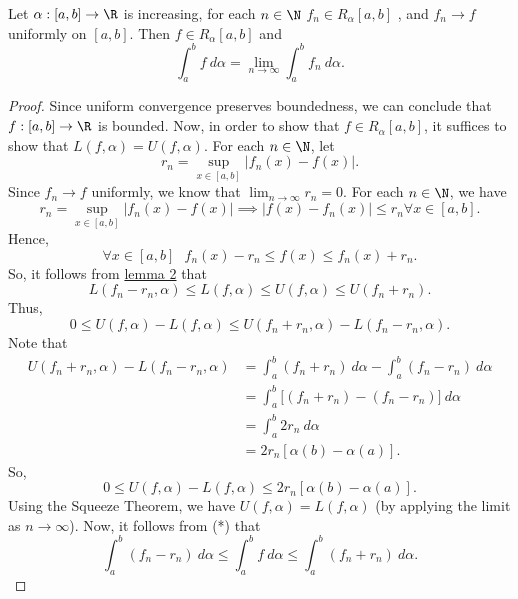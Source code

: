 \begin{theorem}[Rudin 7.16]
    Let \( \alpha: [a,b] \to \R  \) is increasing, for each \( n \in \N  \) \( {f}_{n} \in {R}_{\alpha} [a,b] \) , and \( {f}_{n} \to f  \) uniformly on \( [a,b] \). Then \( f \in {R}_{\alpha}[a,b] \) and 
    \[  \int_{ a }^{ b } f  \ d \alpha = \lim_{ n \to \infty  }  \int_{ a }^{ b } {f}_{n}  \ d \alpha. \]
\end{theorem}
\begin{proof}
    Since uniform convergence preserves boundedness, we can conclude that \( f: [a,b] \to \R  \) is bounded. Now, in order to show that \( f \in {R}_{\alpha}[a,b] \), it suffices to show that \( L(f,\alpha) = U(f,\alpha) \). For each \( n \in \N \), let 
    \[  {r}_{n} = \sup_{x \in [a,b]} | {f}_{n}(x) - f(x) |.  \]
    Since \( {f}_{n} \to f  \) uniformly, we know that \( \lim_{ n \to \infty  } {r}_{n} = 0  \). For each \( n \in \N  \), we have 
    \[  {r}_{n} = \sup_{x \in [a,b]} | {f}_{n}(x) - f(x) | \implies | f(x) - {f}_{n}(x) |  \leq {r}_{n} \forall x \in [a,b]. \]
    Hence, 
    \[  \forall x \in [a,b] \ \ \ {f}_{n}(x) - {r}_{n} \leq f(x) \leq {f}_{n}(x) + {r}_{n}. \tag{*}  \]
    So, it follows from {\hyperref[lemma 2]{lemma 2}} that 
    \[  L({f}_{n}- {r}_{n}, \alpha) \leq L(f,\alpha) \leq U(f,\alpha) \leq U({f}_{n} + {r}_{n}). \]
    Thus, 
    \[  0 \leq U(f,\alpha) - L(f,\alpha) \leq U({f}_{n} + {r}_{n}, \alpha) - L({f}_{n}-{r}_{n}, \alpha ). \]
    Note that 
    \begin{align*}
        U({f}_{n} + {r}_{n}, \alpha) - L({f}_{n}- {r}_{n}, \alpha) &= \int_{ a }^{ b } ({f}_{n} + {r}_{n})   \ d \alpha - \int_{ a }^{ b }  ({f}_{n} - {r}_{n}) \ d \alpha  \\
                                                                   &= \int_{ a }^{ b }  \Big[ ({f}_{n} + {r}_{n}) - ({f}_{n} - {r}_{n}) \Big]  \ d \alpha \\
                                                                   &= \int_{ a }^{ b } 2 {r}_{n}  \ d \alpha \\
                                                                   &= 2 {r}_{n} [\alpha(b) - \alpha(a)].
    \end{align*}
    So, 
    \[  0 \leq U(f,\alpha) - L(f,\alpha) \leq 2 {r}_{n} [\alpha(b) - \alpha(a)]. \]
    Using the Squeeze Theorem, we have \( U(f,\alpha) = L(f,\alpha) \) (by applying the limit as \( n \to \infty  \)). Now, it follows from (*) that 
    \[  \int_{ a }^{ b }  ({f}_{n}- {r}_{n})  \ d \alpha \leq \int_{ a }^{ b }  f  \ d \alpha \leq \int_{ a }^{ b }  ({f}_{n} + {r}_{n})   \ d \alpha. \]

\end{proof}

